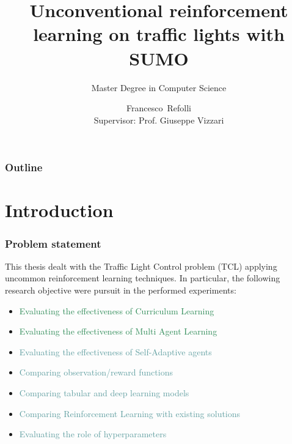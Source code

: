 \documentclass[dvipsnames]{beamer}
\date[26 September 2025]{}
\title[We did it Patrick! We fixed traffic!]{Unconventional reinforcement learning on traffic lights with SUMO}
\subtitle{Master Degree in Computer Science}
\author[RF 865955]{Francesco~Refolli\\[10mm]{\small Supervisor: Prof. Giuseppe Vizzari}}
\begin{document}
\frame{\titlepage}


\begin{frame}
\frametitle{Outline}
\tableofcontents
\end{frame}

\section{Introduction}

\begin{frame}
  \frametitle{Problem statement}

  This thesis dealt with the Traffic Light Control problem (TCL) applying uncommon reinforcement learning techniques.
  In particular, the following research objective were pursuit in the performed experiments:

  \begin{itemize}
    \item \textcolor{SeaGreen}{Evaluating the effectiveness of Curriculum Learning}
    \item \textcolor{SeaGreen}{Evaluating the effectiveness of Multi Agent Learning}
    \item \textcolor{CadetBlue}{Evaluating the effectiveness of Self-Adaptive agents}
    \item \textcolor{CadetBlue}{Comparing observation/reward functions}
    \item \textcolor{CadetBlue}{Comparing tabular and deep learning models}
    \item \textcolor{CadetBlue}{Comparing Reinforcement Learning with existing solutions}
    \item \textcolor{CadetBlue}{Evaluating the role of hyperparameters}
  \end{itemize}
\end{frame}
\end{document}
